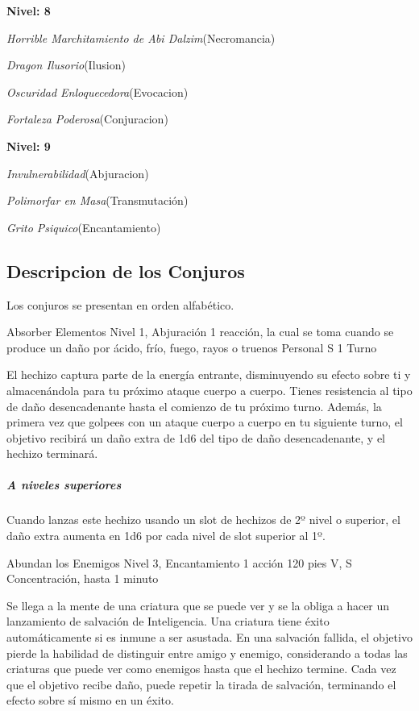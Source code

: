 \documentclass[a4paper,twocolumn,openany,10pt]{dndbook}
\begin{document}
\begin{list}{}{}
	\item \textbf{Nivel: 8}
	\begin{list}{}{}
		\item \textit{Horrible Marchitamiento de Abi Dalzim}(Necromancia)
		\item \textit{Dragon Ilusorio}(Ilusion)
		\item \textit{Oscuridad Enloquecedora}(Evocacion)
		\item \textit{Fortaleza Poderosa}(Conjuracion)
	\end{list}

	\item \textbf{Nivel: 9}
	\begin{list}{}{}
		\item \textit{Invulnerabilidad}(Abjuracion)
		\item \textit{Polimorfar en Masa}(Transmutación)
		\item \textit{Grito Psiquico}(Encantamiento)
	\end{list}
\end{list}

\subsection{Descripcion de los Conjuros}
Los conjuros se presentan en orden alfabético. 

\spellheader%
	{Absorber Elementos}
	{Nivel 1, Abjuración}
	{1 reacción, la cual se toma cuando se produce un daño por ácido, frío, fuego, rayos o truenos}
	{Personal}
	{S}
	{1 Turno}
	
	El hechizo captura parte de la energía entrante, disminuyendo su efecto sobre ti y almacenándola para tu próximo ataque
	cuerpo a cuerpo. Tienes resistencia al tipo de daño desencadenante hasta el comienzo de tu próximo turno. Además, la primera
	vez que golpees con un ataque cuerpo a cuerpo en tu siguiente turno, el objetivo recibirá un daño extra de 1d6 del tipo de
	daño desencadenante, y el hechizo terminará.
	
	\subparagraph{A niveles superiores} Cuando lanzas este hechizo usando un slot de hechizos de 2º nivel o superior, el daño
	extra aumenta en 1d6 por cada nivel de slot superior al 1º. 

\spellheader%
	{Abundan los Enemigos}
	{Nivel 3, Encantamiento}
	{1 acción}
	{120 pies}
	{V, S}
	{Concentración, hasta 1 minuto}
	
	Se llega a la mente de una criatura que se puede ver y se la obliga a hacer un lanzamiento de salvación de Inteligencia. Una
	criatura tiene éxito automáticamente si es inmune a ser asustada. En una salvación fallida, el objetivo pierde la habilidad
	de distinguir entre amigo y enemigo, considerando a todas las criaturas que puede ver como enemigos hasta que el hechizo
	termine. Cada vez que el objetivo recibe daño, puede repetir la tirada de salvación, terminando el efecto sobre sí mismo en
	un éxito.
	
\end{document}
